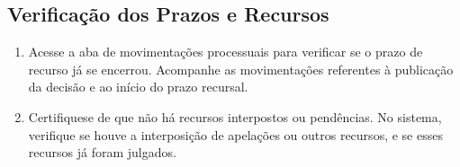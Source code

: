 \documentclass[letterpaper,10pt,brazil]{sphinxmanual}
\begin{document}
\subsection{Verificação dos Prazos e Recursos}
\label{\detokenize{09certificartransito:verificacao-dos-prazos-e-recursos}}\begin{enumerate}
%
\item {} 
\sphinxAtStartPar
Acesse a aba de movimentações processuais para verificar se o prazo de recurso já se encerrou. Acompanhe as movimentações referentes à publicação da decisão e ao início do prazo recursal.

\item {} 
\sphinxAtStartPar
Certifique\sphinxhyphen{}se de que não há recursos interpostos ou pendências. No sistema, verifique se houve a interposição de apelações ou outros recursos, e se esses recursos já foram julgados.

\end{enumerate}
\end{document}
